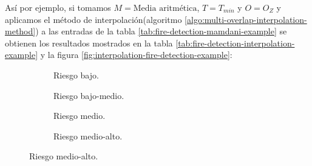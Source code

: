 Así por ejemplo, si tomamos $M = \text{Media aritmética}$, $T = T_{min}$ y $O = O_Z$ y aplicamos el método de interpolación(algoritmo \ref{algo:multi-overlap-interpolation-method}) a las entradas de la tabla \ref{tab:fire-detection-mamdani-example} se obtienen los resultados mostrados en la tabla \ref{tab:fire-detection-interpolation-example} y la figura \ref{fig:interpolation-fire-detection-example}:

\begin{center}
    
    \label{tab:fire-detection-interpolation-example}
\end{center}

\begin{figure}[t]
	\centering
	\begin{subfigure}[b]{0.45\textwidth}
		\setlength\figureheight{3cm}
		\setlength\figurewidth{6cm}
		
		\caption{Riesgo bajo.}\label{fig:fire-detection-interpolation-low}
	\end{subfigure}
	\qquad
	\begin{subfigure}[b]{0.45\textwidth}
		\setlength\figureheight{3cm}
		\setlength\figurewidth{6cm}
		
		\caption{Riesgo bajo-medio.}\label{fig:fire-detection-interpolation-low-medium}
	\end{subfigure}
	
	\vspace{1cm}
	\begin{subfigure}[b]{0.45\textwidth}
		\setlength\figureheight{3cm}
		\setlength\figurewidth{6cm}
		
		\caption{Riesgo medio.}\label{fig:fire-detection-interpolation-medium}
	\end{subfigure}
	\qquad
	\begin{subfigure}[b]{0.45\textwidth}
		\setlength\figureheight{3cm}
		\setlength\figurewidth{6cm}
		
		\caption{Riesgo medio-alto.}\label{fig:fire-detection-interpolation-medium-high}
	\end{subfigure}
	

\end{figure}

